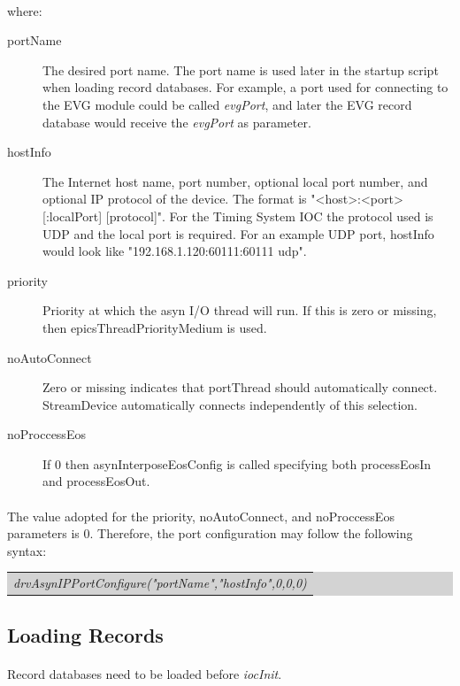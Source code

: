 \documentclass[openany]{article}
\begin{document}
		\paragraph{} where:
		\begin{description}
		\item [portName] The desired port name. The port name is used later in the startup script when loading record databases. For example, a port used for connecting to the EVG module could be called \emph{evgPort}, and later the EVG record database would receive the \emph{evgPort} as parameter.
		\item [hostInfo] The Internet host name, port number, optional local port number, and optional IP protocol of
the device. The format is "\textless host\textgreater:\textless port\textgreater[:localPort] [protocol]". For the Timing System IOC the protocol used is UDP and the local port is required. For an example UDP port, hostInfo would look like "192.168.1.120:60111:60111 udp".
		\item [priority] Priority at which the asyn I/O thread will run. If this is zero or missing, then epicsThreadPriorityMedium is used.
		\item [noAutoConnect] Zero or missing indicates that portThread should automatically connect. StreamDevice automatically connects independently of this selection.
		\item [noProccessEos] If 0 then asynInterposeEosConfig is called specifying both processEosIn and processEosOut.
		\end{description}

		\paragraph{} The value adopted for the priority, noAutoConnect, and noProccessEos parameters is 0. Therefore, the port configuration may follow the following syntax:

		\bigskip
		\colorbox{lightgray}{
			\begin{tabularx}{0.9\textwidth}{X}
			\emph{drvAsynIPPortConfigure("portName","hostInfo",0,0,0)}
			\end{tabularx}
		}

	\subsection{Loading Records}

		\paragraph{} {\color{red}Record databases need to be loaded before \emph{iocInit}.}
\end{document}
